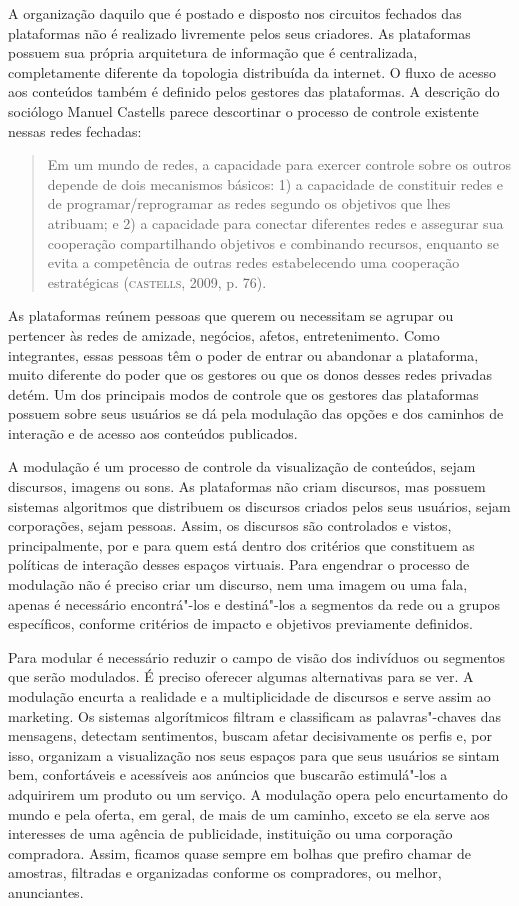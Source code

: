 A organização daquilo que é postado e disposto nos circuitos fechados
das plataformas não é realizado livremente pelos seus criadores. As
plataformas possuem sua própria arquitetura de informação que é
centralizada, completamente diferente da topologia distribuída da
internet. O fluxo de acesso aos conteúdos também é definido pelos
gestores das plataformas. A descrição do sociólogo Manuel Castells
parece descortinar o processo de controle existente nessas redes
fechadas:

\begin{quote}
Em um mundo de redes, a capacidade para exercer controle sobre os outros
depende de dois mecanismos básicos: 1) a capacidade de constituir redes
e de programar/reprogramar as redes segundo os objetivos que lhes
atribuam; e 2) a capacidade para conectar diferentes redes e assegurar
sua cooperação compartilhando objetivos e combinando recursos, enquanto
se evita a competência de outras redes estabelecendo uma cooperação
estratégicas (\textsc{castells}, 2009, p. 76).
\end{quote}

As plataformas reúnem pessoas que querem ou necessitam se agrupar ou
pertencer às redes de amizade, negócios, afetos, entretenimento. Como
integrantes, essas pessoas têm o poder de entrar ou abandonar a
plataforma, muito diferente do poder que os gestores ou que os donos
desses redes privadas detém. Um dos principais modos de controle que os
gestores das plataformas possuem sobre seus usuários se dá pela
modulação das opções e dos caminhos de interação e de acesso aos
conteúdos publicados.

A modulação é um processo de controle da visualização de conteúdos,
sejam discursos, imagens ou sons. As plataformas não criam discursos,
mas possuem sistemas algoritmos que distribuem os discursos criados
pelos seus usuários, sejam corporações, sejam pessoas. Assim, os
discursos são controlados e vistos, principalmente, por e para quem está
dentro dos critérios que constituem as políticas de interação desses
espaços virtuais. Para engendrar o processo de modulação não é preciso
criar um discurso, nem uma imagem ou uma fala, apenas é necessário
encontrá"-los e destiná"-los a segmentos da rede ou a grupos específicos,
conforme critérios de impacto e objetivos previamente definidos.

Para modular é necessário reduzir o campo de visão dos indivíduos ou
segmentos que serão modulados. É preciso oferecer algumas alternativas
para se ver. A modulação encurta a realidade e a multiplicidade de
discursos e serve assim ao marketing. Os sistemas algorítmicos filtram e
classificam as palavras"-chaves das mensagens, detectam sentimentos,
buscam afetar decisivamente os perfis e, por isso, organizam a
visualização nos seus espaços para que seus usuários se sintam bem,
confortáveis e acessíveis aos anúncios que buscarão estimulá"-los a
adquirirem um produto ou um serviço. A modulação opera pelo encurtamento
do mundo e pela oferta, em geral, de mais de um caminho, exceto se ela
serve aos interesses de uma agência de publicidade, instituição ou uma
corporação compradora. Assim, ficamos quase sempre em bolhas que prefiro
chamar de amostras, filtradas e organizadas conforme os compradores, ou
melhor, anunciantes.

